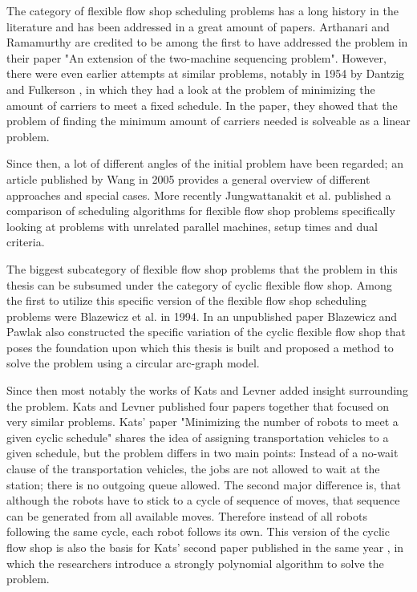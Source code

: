 The category of flexible flow shop scheduling problems has a long history in the literature and has been addressed in a great amount of papers. Arthanari and Ramamurthy \cite{arth1971} are credited to be among the first to have addressed the problem in their paper "An extension of the two-machine sequencing problem". However, there were even earlier attempts at similar problems, notably in 1954 by Dantzig and Fulkerson \cite{dantzig1954}, in which they had a look at the problem of minimizing the amount of carriers to meet a fixed schedule. In the paper, they showed that the problem of finding the minimum amount of carriers needed is solveable as a linear problem.

Since then, a lot of different angles of the initial problem have been regarded; an article published by Wang \cite{wang2005} in 2005 provides a general overview of different approaches and special cases. More recently Jungwattanakit et al. \cite{jung2009} published a comparison of scheduling algorithms for flexible flow shop problems specifically looking at problems with unrelated parallel machines, setup times and dual criteria.

The biggest subcategory of flexible flow shop problems that the problem in this thesis can be subsumed under the category of cyclic flexible flow shop. Among the first to utilize this specific version of the flexible flow shop scheduling problems were Blazewicz et al. \cite{blazewicz1994} in 1994. In an unpublished paper Blazewicz and Pawlak also constructed the specific variation of the cyclic flexible flow shop that poses the foundation upon which this thesis is built \cite{blazewicz1111} and proposed a method to solve the problem using a circular arc-graph model.\cite{blazewicz198}

Since then most notably the works of Kats and Levner added insight surrounding the problem. Kats and Levner published four papers together that focused on very similar problems. Kats' paper "Minimizing the number of robots to meet a given cyclic schedule" \cite{kats1997b} shares the idea of assigning transportation vehicles to a given schedule, but the problem differs in two main points: Instead of a no-wait clause of the transportation vehicles, the jobs are not allowed to wait at the station; there is no outgoing queue allowed. The second major difference is, that although the robots have to stick to a cycle of sequence of moves, that sequence can be generated from all available moves. Therefore instead of all robots following the same cycle, each robot follows its own. This version of the cyclic flow shop is also the basis for Kats' second paper published in the same year \cite{kats1997a}, in which the researchers introduce a strongly polynomial algorithm to solve the problem.

